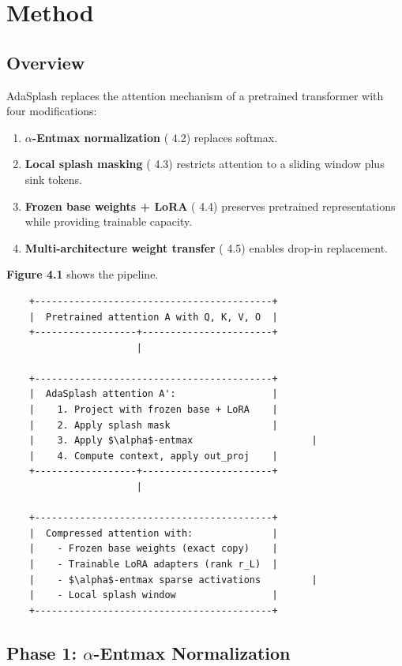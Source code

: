 
\section{Method}

\subsection{Overview}

AdaSplash replaces the attention mechanism of a pretrained transformer with 
four modifications:

\begin{enumerate}
\item \textbf{$\alpha$-Entmax normalization} ( 4.2) replaces softmax.
\item \textbf{Local splash masking} ( 4.3) restricts attention to a sliding window
  plus sink tokens.
\item \textbf{Frozen base weights + LoRA} ( 4.4) preserves pretrained representations
  while providing trainable capacity.
\item \textbf{Multi-architecture weight transfer} ( 4.5) enables drop-in replacement.

\end{enumerate}
\textbf{Figure 4.1} shows the pipeline.

\begin{lstlisting}
    +------------------------------------------+
    |  Pretrained attention A with Q, K, V, O  |
    +------------------+-----------------------+
                       |
                        
    +------------------------------------------+
    |  AdaSplash attention A':                 |
    |    1. Project with frozen base + LoRA    |
    |    2. Apply splash mask                  |
    |    3. Apply $\alpha$-entmax                     |
    |    4. Compute context, apply out_proj    |
    +------------------+-----------------------+
                       |
                        
    +------------------------------------------+
    |  Compressed attention with:              |
    |    - Frozen base weights (exact copy)    |
    |    - Trainable LoRA adapters (rank r_L)  |
    |    - $\alpha$-entmax sparse activations         |
    |    - Local splash window                 |
    +------------------------------------------+
\end{lstlisting}

\subsection{Phase 1: $\alpha$-Entmax Normalization}

